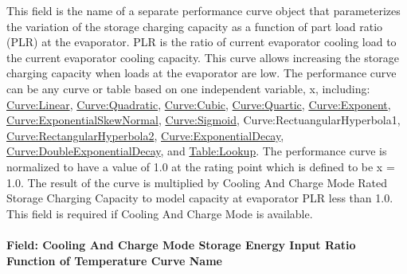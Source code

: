 This field is the name of a separate performance curve object that parameterizes the variation of the storage charging capacity as a function of part load ratio (PLR) at the evaporator. PLR is the ratio of current evaporator cooling load to the current evaporator cooling capacity. This curve allows increasing the storage charging capacity when loads at the evaporator are low. The performance curve can be any curve or table based on one independent variable, x, including: \hyperref[curvelinear]{Curve:Linear}, \hyperref[curvequadratic]{Curve:Quadratic}, \hyperref[curvecubic]{Curve:Cubic}, \hyperref[curvequartic]{Curve:Quartic}, \hyperref[curveexponent]{Curve:Exponent}, \hyperref[curveexponentialskewnormal]{Curve:ExponentialSkewNormal}, \hyperref[curvesigmoid]{Curve:Sigmoid}, Curve:RectuangularHyperbola1, \hyperref[curverectangularhyperbola2]{Curve:RectangularHyperbola2}, \hyperref[curveexponentialdecay]{Curve:ExponentialDecay}, \hyperref[curvedoubleexponentialdecay]{Curve:DoubleExponentialDecay}, and \hyperref[tablelookup]{Table:Lookup}. The performance curve is normalized to have a value of 1.0 at the rating point which is defined to be x = 1.0. The result of the curve is multiplied by Cooling And Charge Mode Rated Storage Charging Capacity to model capacity at evaporator PLR less than 1.0. This field is required if Cooling And Charge Mode is available.

\paragraph{Field: Cooling And Charge Mode Storage Energy Input Ratio Function of Temperature Curve Name}\label{field-cooling-and-charge-mode-storage-energy-input-ratio-function-of-temperature-curve-name}

